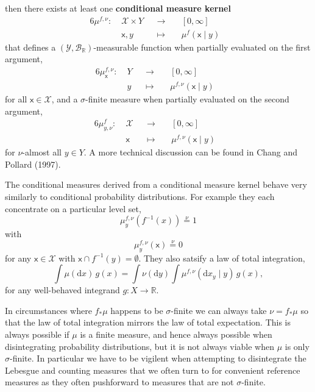 \documentclass[
  letterpaper,
  DIV=11,
  numbers=noendperiod]{scrartcl}
\begin{document}
then there exists at least one \textbf{conditional measure kernel}
\begin{alignat*}{6}
\mu^{f, \nu} :\; &\mathcal{X} \times Y& &\rightarrow& \; &[0, \infty]&
\\
&\mathsf{x}, y& &\mapsto& &\mu^{f}( \mathsf{x} \mid y )&
\end{alignat*} that defines a
\((\mathcal{Y}, \mathcal{B}_{\mathbb{R}})\)-measurable function when
partially evaluated on the first argument, \begin{alignat*}{6}
\mu^{f, \nu}_{\mathsf{x}} :\; &Y& &\rightarrow& \; &[0, \infty]&
\\
&y& &\mapsto& &\mu^{f, \nu}( \mathsf{x} \mid y )&
\end{alignat*} for all \(\mathsf{x} \in \mathcal{X}\), and a
\(\sigma\)-finite measure when partially evaluated on the second
argument, \begin{alignat*}{6}
\mu^{f}_{y, \nu} :\; &\mathcal{X}& &\rightarrow& \; &[0, \infty]&
\\
&\mathsf{x}& &\mapsto& &\mu^{f, \nu}( \mathsf{x} \mid y )&
\end{alignat*} for \(\nu\)-almost all \(y \in Y\). A more technical
discussion can be found in Chang and Pollard (1997).

The conditional measures derived from a conditional measure kernel
behave very similarly to conditional probability distributions. For
example they each concentrate on a particular level set, \[
\mu^{f, \nu}_{y}( f^{-1}(x) ) \overset{\nu}{=} 1
\] with \[
\mu^{f, \nu}_{y}( \mathsf{x} ) \overset{\nu}{=} 0
\] for any \(\mathsf{x} \in \mathcal{X}\) with
\(\mathsf{x} \cap f^{-1}(y) = \emptyset\). They also satsify a law of
total integration, \[
\int \mu( \mathrm{d} x ) \, g(x)
=
\int \nu (\mathrm{d} y)
\int \mu^{f, \nu}( \mathrm{d}x_{y} \mid y ) \, g(x),
\] for any well-behaved integrand \(g : X \rightarrow \mathbb{R}\).

In circumstances where \(f_{*} \mu\) happens to be \(\sigma\)-finite we
can always take \(\nu = f_{*} \mu\) so that the law of total integration
mirrors the law of total expectation. This is always possible if \(\mu\)
is a finite measure, and hence always possible when disintegrating
probability distributions, but it is not always viable when \(\mu\) is
only \(\sigma\)-finite. In particular we have to be vigilent when
attempting to disintegrate the Lebesgue and counting measures that we
often turn to for convenient reference measures as they often
pushforward to measures that are not \(\sigma\)-finite.
\end{document}
